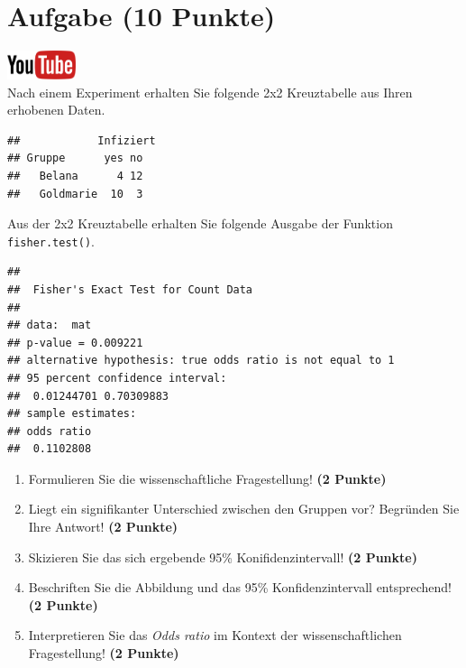 \documentclass[a4paper, 9pt]{scrartcl}\usepackage[]{graphicx}\usepackage[]{xcolor}
\makeatletter
\newenvironment{kframe}{%
 \def\at@end@of@kframe{}%
 \ifinner\ifhmode%
  \def\at@end@of@kframe{\end{minipage}}%
  \begin{minipage}{\columnwidth}%
 \fi\fi%
 \def\FrameCommand##1{\hskip\@totalleftmargin \hskip-\fboxsep
 \colorbox{shadecolor}{##1}\hskip-\fboxsep
     \hskip-\linewidth \hskip-\@totalleftmargin \hskip\columnwidth}%
 \MakeFramed {\advance\hsize-\width
   \@totalleftmargin\z@ \linewidth\hsize
   \@setminipage}}%
 {\par\unskip\endMakeFramed%
 \at@end@of@kframe}
\newenvironment{knitrout}{}{} %
\makeatother
\begin{document}
\section{Aufgabe \hfill (10 Punkte)}

\hfill\href{https://youtu.be/ghArbetOr_E}{\includegraphics[width =
  2cm]{img/youtube}}\\[1Ex]

Nach einem Experiment erhalten Sie folgende 2x2 Kreuztabelle aus Ihren
erhobenen Daten.

\begin{knitrout}
\color{fgcolor}\begin{kframe}
\begin{verbatim}
##            Infiziert
## Gruppe      yes no
##   Belana      4 12
##   Goldmarie  10  3
\end{verbatim}
\end{kframe}
\end{knitrout}

Aus der 2x2 Kreuztabelle erhalten Sie folgende \Rlogo Ausgabe der Funktion
\texttt{fisher.test()}.

\begin{knitrout}
\color{fgcolor}\begin{kframe}
\begin{verbatim}
## 
## 	Fisher's Exact Test for Count Data
## 
## data:  mat
## p-value = 0.009221
## alternative hypothesis: true odds ratio is not equal to 1
## 95 percent confidence interval:
##  0.01244701 0.70309883
## sample estimates:
## odds ratio 
##  0.1102808
\end{verbatim}
\end{kframe}
\end{knitrout}


\begin{enumerate}
\item Formulieren Sie die wissenschaftliche Fragestellung! \textbf{(2 Punkte)}
\item Liegt ein signifikanter Unterschied zwischen den Gruppen vor?
  Begr{\"u}nden Sie Ihre Antwort! \textbf{(2 Punkte)}
\item Skizieren Sie das sich ergebende 95\% Konifidenzintervall! \textbf{(2 Punkte)}
\item Beschriften Sie die Abbildung und
  das 95\% Konfidenzintervall entsprechend! \textbf{(2 Punkte)} 
\item Interpretieren Sie das \textit{Odds ratio} im Kontext der
  wissenschaftlichen Fragestellung! \textbf{(2 Punkte)} 
\end{enumerate}
 
\end{document}
